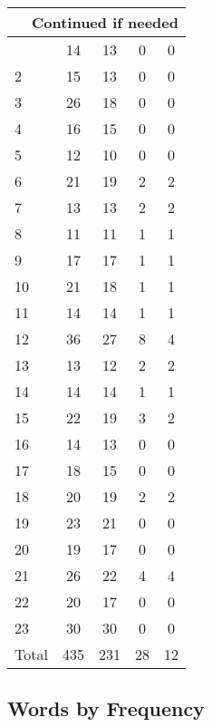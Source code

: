\begin{center}
\begin{longtable}{l|c|c|c|c}
\hline \multicolumn{5}{|r|}{{Continued if needed}} \\ \hline
\endfoot 
1 & 14 & 13 & 0 & 0\\ \hline
2 & 15 & 13 & 0 & 0\\ \hline
3 & 26 & 18 & 0 & 0\\ \hline
4 & 16 & 15 & 0 & 0\\ \hline
5 & 12 & 10 & 0 & 0\\ \hline
6 & 21 & 19 & 2 & 2\\ \hline
7 & 13 & 13 & 2 & 2\\ \hline
8 & 11 & 11 & 1 & 1\\ \hline
9 & 17 & 17 & 1 & 1\\ \hline
10 & 21 & 18 & 1 & 1\\ \hline
11 & 14 & 14 & 1 & 1\\ \hline
12 & 36 & 27 & 8 & 4\\ \hline
13 & 13 & 12 & 2 & 2\\ \hline
14 & 14 & 14 & 1 & 1\\ \hline
15 & 22 & 19 & 3 & 2\\ \hline
16 & 14 & 13 & 0 & 0\\ \hline
17 & 18 & 15 & 0 & 0\\ \hline
18 & 20 & 19 & 2 & 2\\ \hline
19 & 23 & 21 & 0 & 0\\ \hline
20 & 19 & 17 & 0 & 0\\ \hline
21 & 26 & 22 & 4 & 4\\ \hline
22 & 20 & 17 & 0 & 0\\ \hline
23 & 30 & 30 & 0 & 0\\ \hline
\hline \hline
Total & 435 & 231 & 28 & 12



\end{longtable}
\end{center}

 
\subsection{Words by Frequency}

